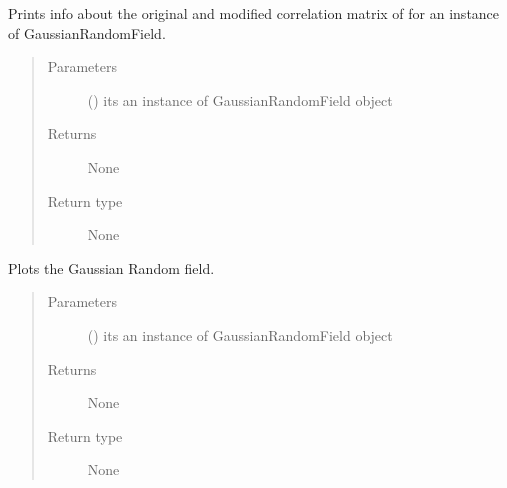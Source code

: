 \documentclass[letterpaper,10pt,english]{sphinxmanual}
\begin{document}

\begin{fulllineitems}
\label{\detokenize{testsFunc:testsFunc.testCorrelationMatrix}}
\sphinxAtStartPar
Prints info about the original and modified correlation matrix of for an instance of GaussianRandomField.
\begin{quote}\begin{description}
\item[{Parameters}] \leavevmode
\sphinxAtStartPar
{} () \textendash{} its an instance of GaussianRandomField object

\item[{Returns}] \leavevmode
\sphinxAtStartPar
None

\item[{Return type}] \leavevmode
\sphinxAtStartPar
None

\end{description}\end{quote}

\end{fulllineitems}


\begin{fulllineitems}
\label{\detokenize{testsFunc:testsFunc.testGaussianRandomField}}
\sphinxAtStartPar
Plots the Gaussian Random field.
\begin{quote}\begin{description}
\item[{Parameters}] \leavevmode
\sphinxAtStartPar
{} () \textendash{} its an instance of GaussianRandomField object

\item[{Returns}] \leavevmode
\sphinxAtStartPar
None

\item[{Return type}] \leavevmode
\sphinxAtStartPar
None

\end{description}\end{quote}

\end{fulllineitems}
\end{document}
